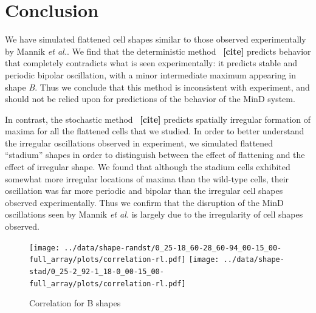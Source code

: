 \documentclass[letterpaper,twocolumn,amsmath,amssymb,pre]{revtex4-1}
\newcommand{\red}[1]{{\bf \color{red} #1}}
\newcommand{\fixme}[1]{\red{[#1]}}
\begin{document}
\section{Conclusion}
We have simulated flattened cell shapes similar to those observed
experimentally by Mannik \emph{et al.}.  We find that the
deterministic method~\fixme{cite} predicts behavior that completely
contradicts what is seen experimentally: it predicts stable and
periodic bipolar oscillation, with a minor intermediate maximum
appearing in shape \emph{B}.  Thus we conclude that this method is
inconsistent with experiment, and should not be relied upon for
predictions of the behavior of the MinD system.

In contrast, the stochastic method~\fixme{cite} predicts spatially
irregular formation of maxima for all the flattened cells that we
studied.  In order to better understand the irregular oscillations
observed in experiment, we simulated flattened ``stadium'' shapes in
order to distinguish between the effect of flattening and the effect
of irregular shape.  We found that although the stadium cells
exhibited somewhat more irregular locations of maxima than the
wild-type cells, their oscillation was far more periodic and bipolar
than the irregular cell shapes observed experimentally.  Thus we
confirm that the disruption of the MinD oscillations seen by Mannik
\emph{et al.} is largely due to the irregularity of cell shapes
observed.



\begin{figure}
  \texttt{[image: ../data/shape-randst/0\_25-18\_60-28\_60-94\_00-15\_00-full\_array/plots/correlation-rl.pdf]}
  \texttt{[image: ../data/shape-stad/0\_25-2\_92-1\_18-0\_00-15\_00-full\_array/plots/correlation-rl.pdf]}
  \caption{Correlation for B shapes}
  \label{corr-B}
\end{figure}
\end{document}
